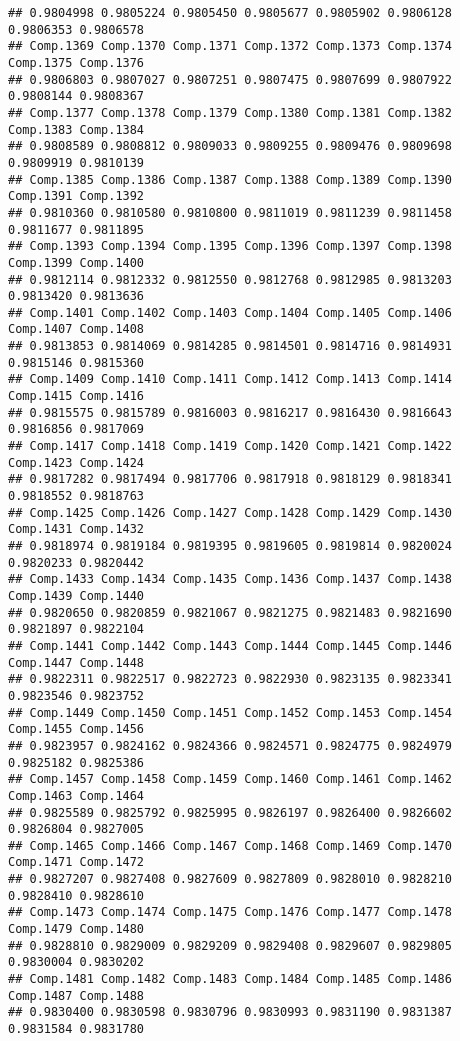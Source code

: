 \documentclass[
]{article}
\begin{document}
\begin{verbatim}
## 0.9804998 0.9805224 0.9805450 0.9805677 0.9805902 0.9806128 0.9806353 0.9806578 
## Comp.1369 Comp.1370 Comp.1371 Comp.1372 Comp.1373 Comp.1374 Comp.1375 Comp.1376 
## 0.9806803 0.9807027 0.9807251 0.9807475 0.9807699 0.9807922 0.9808144 0.9808367 
## Comp.1377 Comp.1378 Comp.1379 Comp.1380 Comp.1381 Comp.1382 Comp.1383 Comp.1384 
## 0.9808589 0.9808812 0.9809033 0.9809255 0.9809476 0.9809698 0.9809919 0.9810139 
## Comp.1385 Comp.1386 Comp.1387 Comp.1388 Comp.1389 Comp.1390 Comp.1391 Comp.1392 
## 0.9810360 0.9810580 0.9810800 0.9811019 0.9811239 0.9811458 0.9811677 0.9811895 
## Comp.1393 Comp.1394 Comp.1395 Comp.1396 Comp.1397 Comp.1398 Comp.1399 Comp.1400 
## 0.9812114 0.9812332 0.9812550 0.9812768 0.9812985 0.9813203 0.9813420 0.9813636 
## Comp.1401 Comp.1402 Comp.1403 Comp.1404 Comp.1405 Comp.1406 Comp.1407 Comp.1408 
## 0.9813853 0.9814069 0.9814285 0.9814501 0.9814716 0.9814931 0.9815146 0.9815360 
## Comp.1409 Comp.1410 Comp.1411 Comp.1412 Comp.1413 Comp.1414 Comp.1415 Comp.1416 
## 0.9815575 0.9815789 0.9816003 0.9816217 0.9816430 0.9816643 0.9816856 0.9817069 
## Comp.1417 Comp.1418 Comp.1419 Comp.1420 Comp.1421 Comp.1422 Comp.1423 Comp.1424 
## 0.9817282 0.9817494 0.9817706 0.9817918 0.9818129 0.9818341 0.9818552 0.9818763 
## Comp.1425 Comp.1426 Comp.1427 Comp.1428 Comp.1429 Comp.1430 Comp.1431 Comp.1432 
## 0.9818974 0.9819184 0.9819395 0.9819605 0.9819814 0.9820024 0.9820233 0.9820442 
## Comp.1433 Comp.1434 Comp.1435 Comp.1436 Comp.1437 Comp.1438 Comp.1439 Comp.1440 
## 0.9820650 0.9820859 0.9821067 0.9821275 0.9821483 0.9821690 0.9821897 0.9822104 
## Comp.1441 Comp.1442 Comp.1443 Comp.1444 Comp.1445 Comp.1446 Comp.1447 Comp.1448 
## 0.9822311 0.9822517 0.9822723 0.9822930 0.9823135 0.9823341 0.9823546 0.9823752 
## Comp.1449 Comp.1450 Comp.1451 Comp.1452 Comp.1453 Comp.1454 Comp.1455 Comp.1456 
## 0.9823957 0.9824162 0.9824366 0.9824571 0.9824775 0.9824979 0.9825182 0.9825386 
## Comp.1457 Comp.1458 Comp.1459 Comp.1460 Comp.1461 Comp.1462 Comp.1463 Comp.1464 
## 0.9825589 0.9825792 0.9825995 0.9826197 0.9826400 0.9826602 0.9826804 0.9827005 
## Comp.1465 Comp.1466 Comp.1467 Comp.1468 Comp.1469 Comp.1470 Comp.1471 Comp.1472 
## 0.9827207 0.9827408 0.9827609 0.9827809 0.9828010 0.9828210 0.9828410 0.9828610 
## Comp.1473 Comp.1474 Comp.1475 Comp.1476 Comp.1477 Comp.1478 Comp.1479 Comp.1480 
## 0.9828810 0.9829009 0.9829209 0.9829408 0.9829607 0.9829805 0.9830004 0.9830202 
## Comp.1481 Comp.1482 Comp.1483 Comp.1484 Comp.1485 Comp.1486 Comp.1487 Comp.1488 
## 0.9830400 0.9830598 0.9830796 0.9830993 0.9831190 0.9831387 0.9831584 0.9831780 

\end{verbatim}
\end{document}
